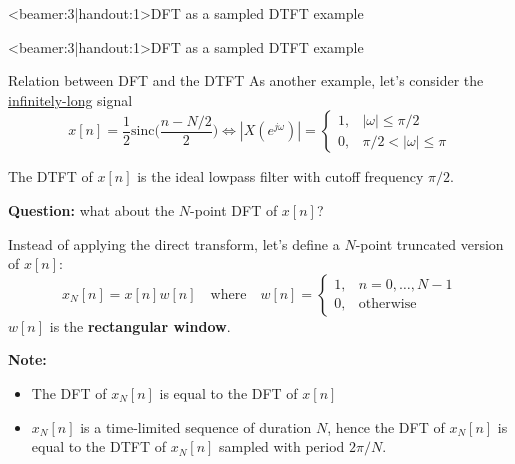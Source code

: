 \documentclass[10pt, handout]{beamer}
\begin{document}
%
\begin{frame}<beamer:3|handout:1>{DFT as a sampled DTFT example}
\vspace{-0.7cm}
\begin{center}
	\def\N{3}
	\def\Ns{5}
	\resizebox{\linewidth}{!}{}
\end{center}
\end{frame}

%
\begin{frame}<beamer:3|handout:1>{DFT as a sampled DTFT example}
\vspace{-0.25cm}
\begin{center}
	\def\N{3}
	\def\Ns{4}
	\def\TIMEALIASING{1}
	\resizebox{\linewidth}{!}{}
\end{center}
\end{frame}

% 
\begin{frame}{Relation between DFT and the DTFT}
As another example, let's consider the \underline{infinitely-long} signal 
\begin{equation*}
x[n] = \frac{1}{2}\mathrm{sinc}\Big(\frac{n-N/2}{2}\Big) \Longleftrightarrow |X(e^{j\omega})| = \begin{cases}
1, & |\omega| \leq \pi/2 \\
0, & \pi/2 < |\omega|\leq\pi
\end{cases}
\end{equation*}

The DTFT of $x[n]$ is the ideal lowpass filter with cutoff frequency $\pi/2$.
\vspace{0.25cm}

\textbf{Question:} what about the $N$-point DFT of $x[n]$?
\pause

Instead of applying the direct transform, let's define a $N$-point truncated version of $x[n]$:
\begin{equation*}
x_N[n] = x[n]w[n] \quad\text{where}\quad w[n] = \begin{cases}
1, &n =0, \ldots, N-1 \\
0, &\text{otherwise}
\end{cases}
\end{equation*}
$w[n]$ is the \textbf{rectangular window}.

\textbf{Note:}
\begin{itemize}
	\item The DFT of $x_N[n]$ is equal to the DFT of $x[n]$
	\item $x_N[n]$ is a time-limited sequence of duration $N$, hence the DFT of $x_N[n]$ is equal to the DTFT of $x_N[n]$ sampled with period $2\pi/N$.
\end{itemize}
\end{frame}
\end{document}

